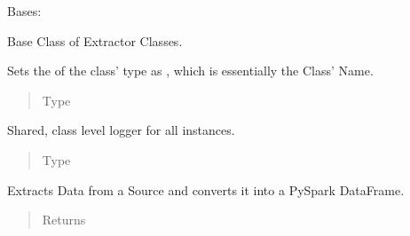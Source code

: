 \documentclass[a4paper,10pt, twoside,english]{sphinxmanual}
\begin{document}
\begin{fulllineitems}
\label{\detokenize{base_classes/extractor:spooq2.extractor.extractor.Extractor}}
Bases: 

Base Class of Extractor Classes.

\begin{fulllineitems}
\label{\detokenize{base_classes/extractor:spooq2.extractor.extractor.Extractor.name}}
Sets the  of the class’ type as , which is essentially the Class’ Name.
\begin{quote}\begin{description}
\item[{Type}] \leavevmode
{}

\end{description}\end{quote}

\end{fulllineitems}


\begin{fulllineitems}
\label{\detokenize{base_classes/extractor:spooq2.extractor.extractor.Extractor.logger}}
Shared, class level logger for all instances.
\begin{quote}\begin{description}
\item[{Type}] \leavevmode
{}

\end{description}\end{quote}

\end{fulllineitems}


\begin{fulllineitems}
\label{\detokenize{base_classes/extractor:spooq2.extractor.extractor.Extractor.extract}}
Extracts Data from a Source and converts it into a PySpark DataFrame.
\begin{quote}\begin{description}
\item[{Returns}] \leavevmode



\end{description}
\end{quote}
\end{fulllineitems}
\end{fulllineitems}
\end{document}
